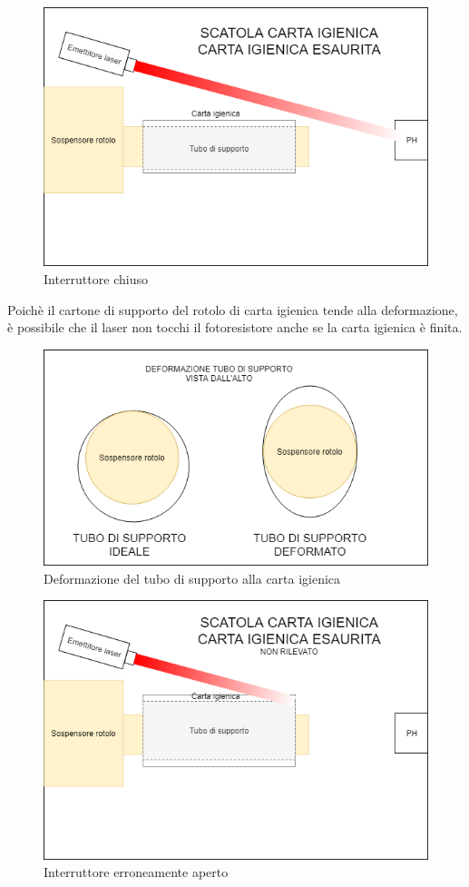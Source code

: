 \documentclass[12pt]{article}
\begin{document}
 
 \begin{figure}[h!]
\centering
	\includegraphics[scale=0.55]{img/parteLocale/CartaIgienicaEsaurita.png}  
    \caption{Interruttore chiuso}
\end{figure}
Poichè il cartone di supporto del rotolo di carta igienica tende alla deformazione, è possibile che il laser non tocchi il fotoresistore anche se la carta igienica è finita.
 \begin{figure}[h!]
\centering
	\includegraphics[scale=0.55]{img/parteLocale/DeformazioneTubo.png}  
    \caption{Deformazione del tubo di supporto alla carta igienica}
\end{figure}
 \begin{figure}[h!]
\centering
	\includegraphics[scale=0.55]{img/parteLocale/ProblemaDeformazione.png}  
    \caption{Interruttore erroneamente aperto}
\end{figure}
\end{document}

